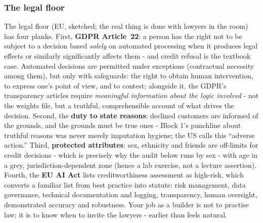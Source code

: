 \documentclass[11pt,a4paper]{article}
\begin{document}
\subsubsection{The legal floor}
The legal floor (EU, sketched; the real thing is done with lawyers in
the room) has four planks. First, \textbf{GDPR Article~22}: a person
has the right not to be subject to a decision based \emph{solely} on
automated processing when it produces legal effects or similarly
significantly affects them - and credit refusal is the textbook case.
Automated decisions are permitted under exceptions (contractual
necessity among them), but only with safeguards: the right to obtain
human intervention, to express one's point of view, and to contest;
alongside it, the GDPR's transparency articles require \emph{meaningful
information about the logic involved} - not the weights file, but a
truthful, comprehensible account of what drives the decision. Second,
the \textbf{duty to state reasons}: declined customers are informed of
the grounds, and the grounds must be true ones - Block 1's punchline
about truthful reasons was never merely imputation hygiene; the US
calls this ``adverse action.'' Third, \textbf{protected attributes}:
sex, ethnicity and friends are off-limits for credit decisions - which
is precisely why the audit below runs by sex - with age in a grey,
jurisdiction-dependent zone (hence a lab exercise, not a lecture
assertion). Fourth, the \textbf{EU AI Act} lists creditworthiness
assessment as high-risk, which converts a familiar list from best
practice into statute: risk management, data governance, technical
documentation and logging, transparency, human oversight, demonstrated
accuracy and robustness. Your job as a builder is not to practise law;
it is to know when to invite the lawyers - earlier than feels natural.
\end{document}
